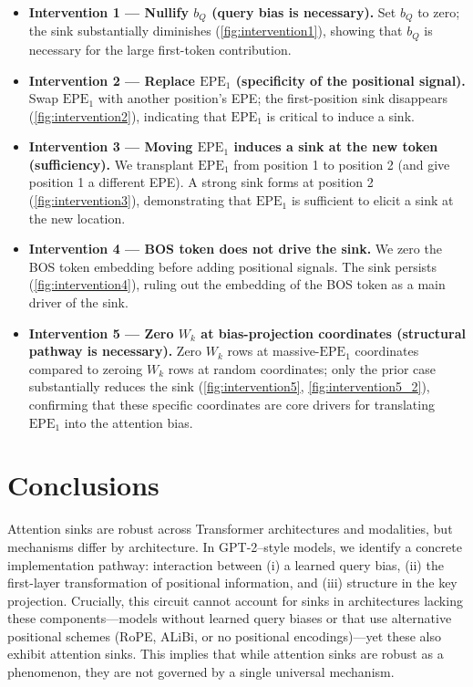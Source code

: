 \documentclass[11pt]{article}
\begin{document}
\begin{itemize}[leftmargin=*]
  \item \textbf{Intervention 1 — Nullify $b_Q$ (query bias is necessary).} Set $b_Q$ to zero; the sink substantially diminishes (\cref{fig:intervention1}), showing that $b_Q$ is necessary for the large first-token contribution.
  \item \textbf{Intervention 2 — Replace $\mathrm{EPE}_1$ (specificity of the positional signal).} Swap $\mathrm{EPE}_1$ with another position’s EPE; the first-position sink disappears (\cref{fig:intervention2}), indicating that $\mathrm{EPE}_1$ is critical to induce a sink.
  \item \textbf{Intervention 3 — Moving $\mathrm{EPE}_1$ induces a sink at the new token (sufficiency).} We transplant $\mathrm{EPE}_1$ from position 1 to position 2 (and give position 1 a different EPE). A strong sink forms at position 2 (\cref{fig:intervention3}), demonstrating that $\mathrm{EPE}_1$ is sufficient to elicit a sink at the new location.
  \item \textbf{Intervention 4 — BOS token does not drive the sink.} We zero the BOS token embedding before adding positional signals. The sink persists (\cref{fig:intervention4}), ruling out the embedding of the BOS token as a main driver of the sink.
  \item \textbf{Intervention 5 — Zero $W_k$ at bias-projection coordinates (structural pathway is necessary).} Zero $W_k$ rows at massive-$\mathrm{EPE}_1$ coordinates compared to zeroing $W_k$ rows at random coordinates; only the prior case substantially reduces the sink (\cref{fig:intervention5}, \cref{fig:intervention5_2}), confirming that these specific coordinates are core drivers for translating $\mathrm{EPE}_1$ into the attention bias.
\end{itemize}

\section{Conclusions}
Attention sinks are robust across Transformer architectures and modalities, but mechanisms differ by architecture. In GPT-2–style models, we identify a concrete implementation pathway: interaction between  (i) a learned query bias, (ii) the 
first-layer transformation of positional information, and (iii) structure 
in the key projection. Crucially, this circuit cannot account for sinks in architectures lacking these components—models without learned query biases or that use alternative positional schemes (RoPE, ALiBi, or no positional encodings)—yet these also exhibit attention sinks. This implies that while attention sinks are robust as a phenomenon, they are not governed by a single universal mechanism.
\end{document}
